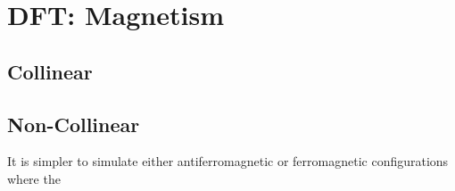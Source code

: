 \section{DFT: Magnetism}

\subsection{Collinear}





\subsection{Non-Collinear}

It is simpler to simulate either antiferromagnetic or ferromagnetic configurations where the 




